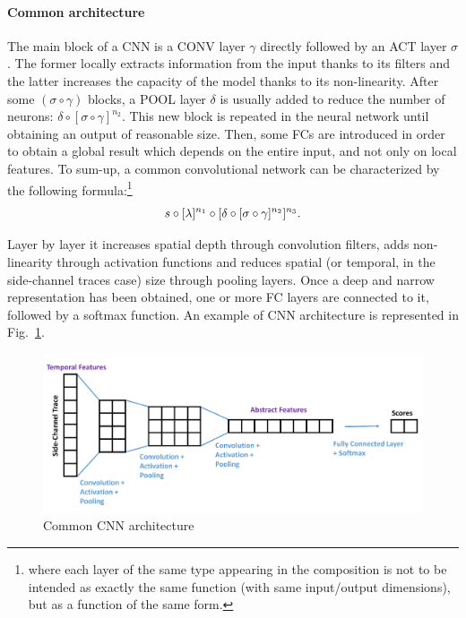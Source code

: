 \paragraph*{Common architecture}
The main block of a CNN is a CONV layer $\gamma$ directly followed by an ACT layer $\sigma$. The former locally extracts information from the input thanks to its filters and the latter increases the capacity of the model thanks to its non-linearity. After some $ ( \sigma \circ \gamma)$  blocks, a POOL layer $\delta$ is usually added to reduce the number of neurons: $\delta \circ [ \sigma\circ \gamma]^{n_2} $. This new block is repeated in the neural network until obtaining an output of reasonable size. Then, some FCs are introduced in order to obtain a global result which depends on the entire input, and not only on local features. To sum-up, a common convolutional network can be characterized by the following formula:\footnote{where each layer of the same type appearing in the composition is not to be intended as exactly the same function (\eg with same input/output dimensions), but as a function of the same form.} 
\begin{equation}\label{equ:CCN}
  s \circ [\lambda]^{n_1} \circ[\delta \circ [\sigma \circ \gamma  ]^{n_2} ]^{n_3}  .
\end{equation}

 Layer by layer it increases spatial depth through convolution filters, adds non-linearity through activation functions and reduces spatial (or temporal, in the side-channel traces case) size through pooling layers. Once a deep and narrow representation has been obtained, one or more FC layers are connected to it, followed by a softmax function. An example of CNN architecture is represented in Fig.~\ref{fig:archi_conv}. 
\begin{figure}[h]
\centering
\includegraphics[width=\textwidth]{../Figures/CHES2017/convnet_arch.pdf}
\caption{Common CNN architecture}
\label{fig:archi_conv}
\end{figure} 



